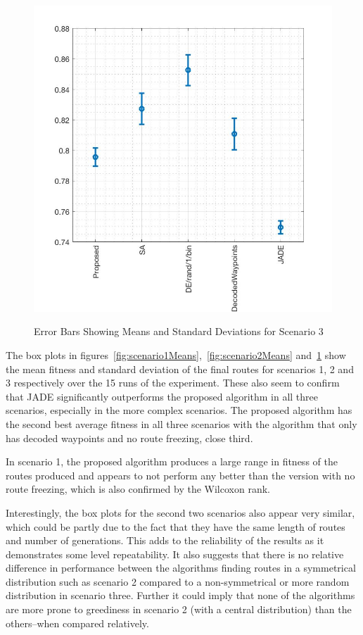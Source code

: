\documentclass[10pt,a4paper, oneside, conference]{IEEEtran}
\begin{document}
	\begin{figure}[t]
	\caption{Error Bars Showing Means and Standard Deviations for Scenario 3}
	\centering
	\includegraphics[width=0.8\linewidth]{scenario3Means.jpg}
	\label{fig:scenario3Means}	
	\end{figure}	
	
The box plots in figures~\ref{fig:scenario1Means},~\ref{fig:scenario2Means} and~\ref{fig:scenario3Means} show the mean fitness and standard deviation of the final routes for scenarios 1, 2 and 3 respectively over the 15 runs of the experiment.
These also seem to confirm that JADE significantly outperforms the proposed algorithm in all three scenarios, especially in the more complex scenarios.
The proposed algorithm has the second best average fitness in all three scenarios with the algorithm that only has decoded waypoints and no route freezing, close third.

In scenario 1, the proposed algorithm produces a large range in fitness of the routes produced and appears to not perform any better than the version with no route freezing, which is also confirmed by the Wilcoxon rank.

Interestingly, the box plots for the second two scenarios also appear very similar, which could be partly due to the fact that they have the same length of routes and number of generations.
This adds to the reliability of the results as it demonstrates some level repeatability.
It also suggests that there is no relative difference in performance between the algorithms finding routes in a symmetrical distribution such as scenario 2 compared to a non-symmetrical or more random distribution in scenario three.
Further it could imply that none of the algorithms are more prone to greediness in scenario 2 (with a central distribution) than the others--when compared relatively.
\end{document}
